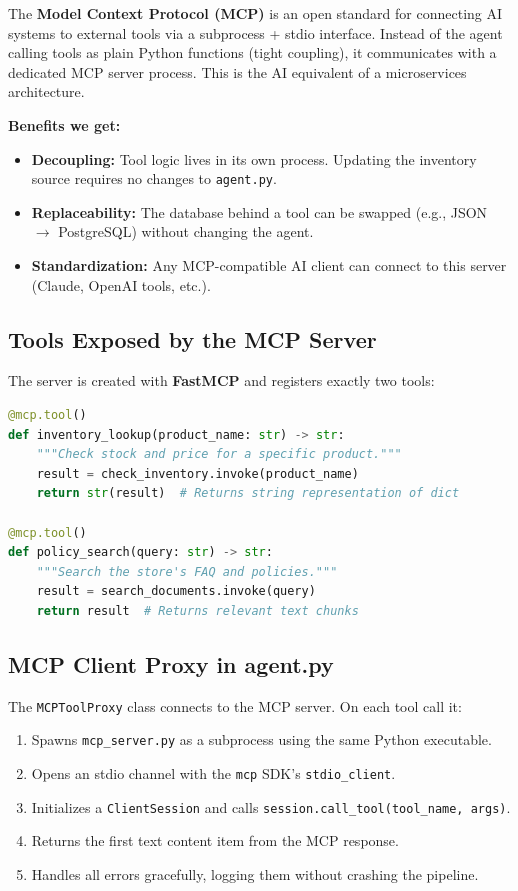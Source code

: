\documentclass[12pt]{article}
\begin{document}
The \textbf{Model Context Protocol (MCP)} is an open standard for connecting AI systems to external tools via a subprocess + stdio interface. Instead of the agent calling tools as plain Python functions (tight coupling), it communicates with a dedicated MCP server process. This is the AI equivalent of a microservices architecture.

\textbf{Benefits we get:}
\begin{itemize}[leftmargin=1.5em]
    \item \textbf{Decoupling:} Tool logic lives in its own process. Updating the inventory source requires no changes to \texttt{agent.py}.
    \item \textbf{Replaceability:} The database behind a tool can be swapped (e.g., JSON $\to$ PostgreSQL) without changing the agent.
    \item \textbf{Standardization:} Any MCP-compatible AI client can connect to this server (Claude, OpenAI tools, etc.).
\end{itemize}

\subsection{Tools Exposed by the MCP Server}

The server is created with \textbf{FastMCP} and registers exactly two tools:

\begin{lstlisting}[language=Python]
@mcp.tool()
def inventory_lookup(product_name: str) -> str:
    """Check stock and price for a specific product."""
    result = check_inventory.invoke(product_name)
    return str(result)  # Returns string representation of dict

@mcp.tool()
def policy_search(query: str) -> str:
    """Search the store's FAQ and policies."""
    result = search_documents.invoke(query)
    return result  # Returns relevant text chunks
\end{lstlisting}

\subsection{MCP Client Proxy in agent.py}

The \texttt{MCPToolProxy} class connects to the MCP server. On each tool call it:
\begin{enumerate}[leftmargin=1.5em]
    \item Spawns \texttt{mcp\_server.py} as a subprocess using the same Python executable.
    \item Opens an stdio channel with the \texttt{mcp} SDK's \texttt{stdio\_client}.
    \item Initializes a \texttt{ClientSession} and calls \texttt{session.call\_tool(tool\_name, args)}.
    \item Returns the first text content item from the MCP response.
    \item Handles all errors gracefully, logging them without crashing the pipeline.
\end{enumerate}
\end{document}
